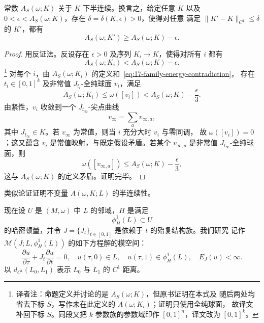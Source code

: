 \begin{proposition}
\label{prop:family-sphere-energy-lsc}
常数 $A_S(\omega;K)$ 关于 $K$ 下半连续。换言之，给定任意 $K$ 以及
$0<\epsilon<A_S(\omega;K)$，存在 $\delta=\delta(K,\epsilon)>0$，使得对任意
满足 $\|K'-K\|_{C^1}\leq\delta$ 的 $K'$，都有
\[
 A_S(\omega;K')\geq A_S(\omega;K)-\epsilon.
\]
\end{proposition}

\begin{proof}
用反证法。反设存在 $\epsilon>0$ 及序列 $K_i\to K$，使得对所有 $i$ 都有
\begin{equation}
 A_S(\omega;K_i)<A_S(\omega;K)-\epsilon.
\label{eq:17-family-energy-contradiction}
\end{equation}
\footnote{译者注：命题定义并讨论的是 $A_S(\omega;K)$，但原书证明在本式及
随后两处均省去下标 $S$，写作未在此定义的 $A(\omega;K_i)$；证明只使用全纯球面，
故译文补回下标 $S$。同段又把 $k$ 参数族的参数域印作 $[0,1]^n$，译文改为
$[0,1]^k$。}
对每个 $i$，由 $A_S(\omega;K_i)$ 的定义和~\eqref{eq:17-family-energy-contradiction}，
存在 $t_i\in[0,1]^k$ 及非常值 $J_{t_i}$-全纯球面 $v_i$，满足
\[
 A_S(\omega;K_i)\leq\omega([v_i])<A_S(\omega;K)-\frac{\epsilon}{3}.
\]
由\personGromov{}紧性，$v_i$ 收敛到一个 $J_{t_\infty}$-尖点曲线
\[
 v_\infty=\sum_a v_{\infty,a},
\]
其中 $J_{t_\infty}\in K$。若 $v_\infty$ 为常值，则当 $i$ 充分大时 $v_i$ 与零同调，
故 $\omega([v_i])=0$；这又蕴含 $v_i$ 是常值映射，与既定假设矛盾。若某个
$v_{\infty,a}$ 是非常值 $J_{t_\infty}$-全纯球面，则
\[
 \omega([v_{\infty,a}])\leq A_S(\omega;K)-\frac{\epsilon}{3},
\]
这与 $A_S(\omega;K)$ 的定义矛盾。证明完毕。
\end{proof}

类似论证证明不变量 $A(\omega,K;L)$ 的半连续性。

现在设 $U$ 是 $(M,\omega)$ 中 $L$ 的\personDarboux{}邻域，$H$ 是满足
\begin{equation}
 \phi_H^1(L)\subset U
\label{eq:17-hamiltonian-image-in-U}
\end{equation}
的哈密顿量，并令 $J=\{J_t\}_{t\in[0,1]}$ 是依赖于 $t$ 的殆复结构族。我们研究
记作 $\mathcal M(J;L,\phi_H^1(L))$ 的如下方程解的模空间：
\[
 \frac{\partial u}{\partial\tau}+J_t\frac{\partial u}{\partial t}=0,
 \quad u(\tau,0)\in L,\quad u(\tau,1)\in\phi_H^1(L),\quad E_J(u)<\infty.
\]
以 $d_{C^1}(L_0,L_1)$ 表示 $L_0$ 与 $L_1$ 的 $C^1$ 距离。

